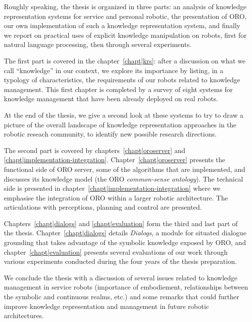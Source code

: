 Roughly speaking, the thesis is organized in three parts: an analysis of
knowledge representation systems for service and personal robotic, the
presentation of ORO, our own implementation of such a knowledge representation
system, and finally we report on practical uses of explicit knowledge
manipulation on robots, first for natural language processing, then through
several experiments.

The first part is covered in the chapter~\ref{chapt|krs}: after a discussion on
what we call ``knowledge'' in our context, we explore its importance by
listing, in a typology of characteristics, the requirements of our robots
related to knowledge management. This first chapter is completed by a survey of
eight systems for knowledge management that have been already deployed on real
robots.

At the end of the thesis, we give a second look at these systems to try to
draw a picture of the overall landscape of knowledge representation approaches
in the robotic reseach community, to identify new possible research directions.

The second part is covered by chapters~\ref{chapt|oroserver} and
\ref{chapt|implementation-integration}. Chapter~\ref{chapt|oroserver} presents
the functional side of ORO server, some of the algorithms that are
implemented, and discusses its knowledge model (the ORO \emph{common-sense
ontology}). The technical side is presented in
chapter~\ref{chapt|implementation-integration} where we emphasise the
integration of ORO within a larger robotic architecture. The articulations with
perceptions, planning and control are presented.

Chapters~\ref{chapt|dialogs} and \ref{chapt|evaluation} form the third and last
part of the thesis. Chapter~\ref{chapt|dialogs} details \emph{Dialogs}, a
module for situated dialogue grounding that takes advantage of the symbolic
knowledge exposed by ORO, and chapter~\ref{chapt|evaluation} presents
several evaluations of our work through various experiments conducted during
the four years of the thesis preparation.

We conclude the thesis with a discussion of several issues related to knowledge
management in service robots (importance of embodiement, relationships between
the symbolic and continuous realms, etc.) and some remarks that could further
improve knowledge representation and management in future robotic
architectures.

